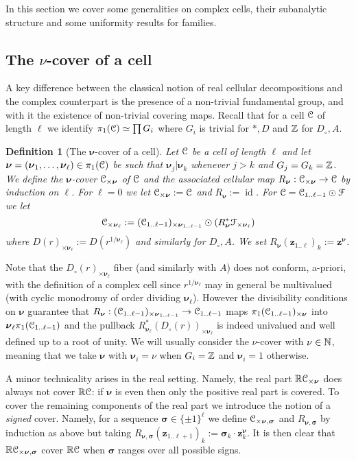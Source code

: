 \documentclass[reqno]{amsart}
\newtheorem{Def}[Cor]{Definition}{\bfseries}{\rmfamily}
\renewcommand\~[1]{\widetilde{#1}}
\def\cF{{\mathcal F}} \def\cL{{\mathcal L}} \def\cR{{\mathcal R}}
\def\id{\operatorname{id}}
\def\vz{{\mathbf z}}
\def\vsigma{{\boldsymbol\sigma}}
\def\vsigma{{\boldsymbol\sigma}}
\def\vnu{{\boldsymbol\nu}}
\begin{document}
In this section we cover some generalities on complex cells, their
subanalytic structure and some uniformity results for families.

\subsection{The $\nu$-cover of a cell}
\label{sec:nu-cover}

A key difference between the classical notion of real cellular
decompositions and the complex counterpart is the presence of a
non-trivial fundamental group, and with it the existence of
non-trivial covering maps. Recall that for a cell ${\mathcal C}$ of length
$\ell$ we identify $\pi_1({\mathcal C})\simeq\prod G_i$ where $G_i$ is trivial
for $*,D$ and ${\mathbb Z}$ for $D_\circ,A$.

\begin{Def}[The $\vnu$-cover of a cell]\label{def:nu-cover}
  Let ${\mathcal C}$ be a cell of length $\ell$ and let
  $\vnu=(\vnu_1,\ldots,\vnu_\ell)\in\pi_1(\cC)$ be such that
  $\vnu_j\vert\vnu_k$ whenever $j>k$ and $G_j=G_k={\mathbb Z}$. We define the
  \emph{$\vnu$-cover} $\cC_{\times\vnu}$ of ${\mathcal C}$ and the associated
  \emph{cellular map} $R_\vnu:\cC_{\times\vnu}\to\cC$ by induction on
  $\ell$. For $\ell=0$ we let $\cC_{\times\vnu}:=\cC$ and
  $R_\vnu:=\id$. For $\cC=\cC_{1..\ell-1}\odot\cF$ we let
  \begin{equation}
    \cC_{\times\vnu_{\ell}}:=(\cC_{1..\ell-1})_{\times\vnu_{1..\ell-1}}
    \odot (R_\vnu^*\cF_{\times\vnu_{\ell}})
  \end{equation}
  where $D(r)_{\times\vnu_\ell}:=D(r^{1/{\vnu_\ell}})$ and similarly for $D_\circ,A$.
  We set $R_\vnu(\vz_{1..\ell})_k:=\vz^\vnu$.
\end{Def}

Note that the $D_\circ(r)_{\times\vnu_\ell}$ fiber (and similarly with
$A$) does not conform, a-priori, with the definition of a complex cell
since $r^{1/\vnu_\ell}$ may in general be multivalued (with cyclic
monodromy of order dividing $\vnu_\ell$). However the divisibility
conditions on $\vnu$ guarantee that
$R_\vnu:(\cC_{1..\ell-1})_{\times\vnu_{1..\ell-1}}\to\cC_{1..\ell-1}$
maps $\pi_1(\cC_{1..\ell-1})_{\times\vnu}$ into
$\vnu_\ell\pi_1(\cC_{1..\ell-1})$ and the pullback
$R_{\vnu_\ell}^*(D_\circ(r))_{\times\vnu_\ell}$ is indeed univalued and well
defined up to a root of unity. We will usually consider the
$\nu$-cover with $\nu\in{\mathbb N}$, meaning that we take $\vnu$ with $\vnu_i=\nu$
when $G_i={\mathbb Z}$ and $\vnu_i=1$ otherwise.

A minor technicality arises in the real setting. Namely, the real part
$\R\cC_{\times\vnu}$ does always not cover ${\mathbb R}{\mathcal C}$: if $\vnu$ is even
then only the positive real part is covered. To cover the remaining
components of the real part we introduce the notion of a \emph{signed}
cover. Namely, for a sequence $\vsigma\in\{\pm1\}^\ell$ we define
$\cC_{\times\vnu,\vsigma}$ and $R_{\vnu,\vsigma}$ by induction as above
but taking
$R_{\vnu,\vsigma}(\vz_{1..\ell+1})_k:=\vsigma_k\cdot\vz_{k}^\vnu$. It is
then clear that $\R\cC_{\times\vnu,\vsigma}$ cover ${\mathbb R}{\mathcal C}$ when
$\vsigma$ ranges over all possible signs.
\end{document}
